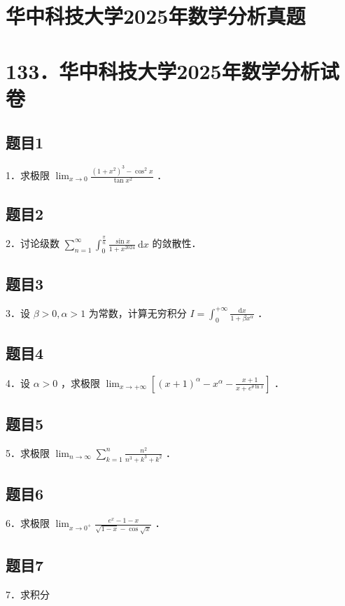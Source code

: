 \documentclass{article}
\begin{document}
\section*{华中科技大学2025年数学分析真题}
\section*{133．华中科技大学2025年数学分析试卷}

\subsection{题目1}
1．求极限 \(\lim _{x \rightarrow 0} \frac{\left(1+x^{2}\right)^{3}-\cos ^{2} x}{\tan x^{2}}\) ．

\subsection{题目2}
2．讨论级数 \(\sum_{n=1}^{\infty} \int_{0}^{\frac{\pi}{n}} \frac{\sin x}{1+x^{2024}} \mathrm{~d} x\) 的敛散性．

\subsection{题目3}
3．设 \(\beta>0, \alpha>1\) 为常数，计算无穷积分 \(I=\int_{0}^{+\infty} \frac{\mathrm{d} x}{1+\beta x^{\alpha}}\) ．

\subsection{题目4}
4．设 \(\alpha>0\) ，求极限 \(\lim _{x \rightarrow+\infty}\left[(x+1)^{\alpha}-x^{\alpha}-\frac{x+1}{x+e^{\theta \ln x}}\right]\) ．

\subsection{题目5}
5．求极限 \(\lim _{n \rightarrow \infty} \sum_{k=1}^{n} \frac{n^{2}}{n^{3}+k^{3}+k^{2}}\) ．

\subsection{题目6}
6．求极限 \(\lim _{x \rightarrow 0^{+}} \frac{e^{x}-1-x}{\sqrt{1-x}-\cos \sqrt{x}}\) ．

\subsection{题目7}
7．求积分
\end{document}
